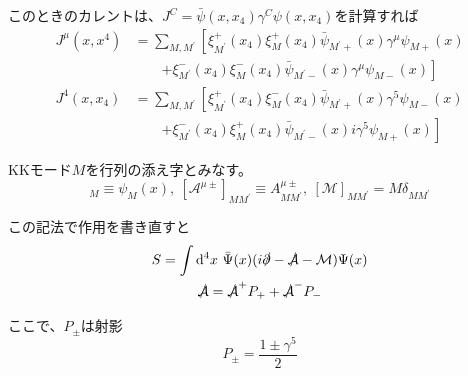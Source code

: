 \documentclass[
  unicode,a4paper,10pt,
  xcolor = {dvipsnames,svgnames},
  hyperref ={colorlinks=true,citecolor=Navy,linkcolor=NavyBlue,urlcolor=purple},
  ja=standard,lualatex
]{beamer}
\begin{document}
\begin{frame}

  このときのカレントは、$J^{C}=\bar{\psi}(x,x_{4})\gamma^{C}\psi(x,x_{4})$を計算すれば
  \begin{align*}
    J^{\mu}(x,x^{4})
    &=
    \sum_{M,M^{\prime}}
    \left[  
      \xi_{M^{\prime}}^{+}(x_{4})\xi_{M}^{+}(x_{4})\bar{\psi}_{M^{\prime}+}(x)\gamma^{\mu}\psi_{M+}(x)
    \right.
    \\
    &\qquad
    \left.
      +\xi_{M^{\prime}}^{-}(x_{4})\xi_{M}^{-}(x_{4})\bar{\psi}_{M^{\prime}-}(x)\gamma^{\mu}\psi_{M-}(x)
    \right]
    \\
    J^{4}(x,x_{4})
    &=
    \sum_{M,M^{\prime}}
    \left[  
      \xi_{M^{\prime}}^{+}(x_{4})\xi_{M}^{-}(x_{4})\bar{\psi}_{M^{\prime}+}(x)\gamma^{5}\psi_{M-}(x)
    \right.
    \\
    &\qquad
    \left.
      +\xi_{M^{\prime}}^{-}(x_{4})\xi_{M}^{+}(x_{4})\bar{\psi}_{M^{\prime}-}(x)i\gamma^{5}\psi_{M+}(x)
    \right]
  \end{align*}
  
\end{frame}


\begin{frame}

  KKモード$M$を行列の添え字とみなす。
  \begin{equation*}
    [\Psi(x)]_{M}
    \equiv
    \psi_{M}(x)
    ,\ 
    [\mathcal{A}^{\mu\pm}]_{MM^{\prime}}
    \equiv
    A^{\mu\pm}_{MM^{\prime}}
    ,\ 
    [\mathcal{M}]_{MM^{\prime}}
    =
    M\delta_{MM^{\prime}}
  \end{equation*}

  この記法で作用を書き直すと
  \begin{gather*}
    S
    =
    \int\dd^4 x\ 
    \bar{\Psi}(x)(i\slashed{\partial}-\slashed{\mathcal{A}}-\mathcal{M})\Psi(x)
    \\
    \slashed{\mathcal{A}}
    =
    \slashed{\mathcal{A}}^{+}P_{+}
    +
    \slashed{\mathcal{A}}^{-}P_{-}    
  \end{gather*}
  
  ここで、$P_{\pm}$は射影
  \begin{equation*}
    P_{\pm}
    =
    \frac{1\pm\gamma^{5}}{2}
  \end{equation*}

\end{frame}
\end{document}
